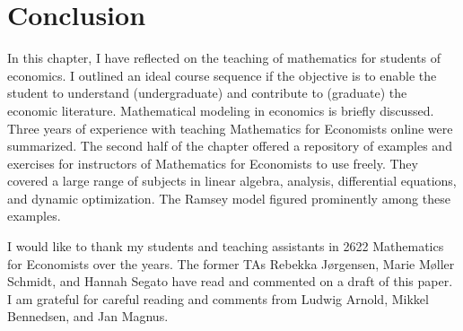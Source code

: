 \documentclass[graybox]{svmult}
\begin{document}
\section{Conclusion}

In this chapter, I have reflected on the teaching of mathematics for students of economics. I outlined an ideal course sequence if the objective is to enable the student to understand (undergraduate) and contribute to (graduate) the economic literature. Mathematical modeling in economics is briefly discussed. Three years of experience with teaching Mathematics for Economists online were summarized. The second half of the chapter offered a repository of examples and exercises for instructors of Mathematics for Economists to use freely. They covered a large range of subjects in linear algebra, analysis, differential equations, and dynamic optimization. The Ramsey model figured prominently among these examples. 


%
\begin{acknowledgement}
I would like to thank my students and teaching assistants in 2622 Mathematics for Economists over the years. The former TAs Rebekka Jørgensen, Marie Møller Schmidt, and Hannah Segato have read and commented on a draft of this paper. I am grateful for careful reading and comments from Ludwig Arnold, Mikkel Bennedsen, and Jan Magnus.
\end{acknowledgement}
%









\end{document}
